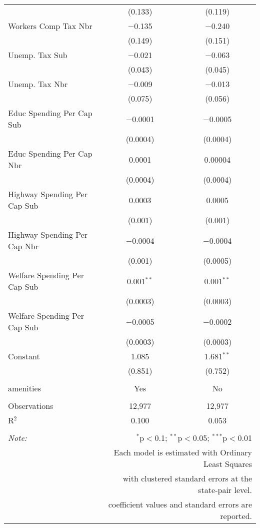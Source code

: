 \begin{table}[!htbp]
\begin{tabular}{@{\extracolsep{5pt}}lcc}
  & (0.133) & (0.119) \\ 
  Workers Comp Tax Nbr & $-$0.135 & $-$0.240 \\ 
  & (0.149) & (0.151) \\ 
  Unemp. Tax Sub & $-$0.021 & $-$0.063 \\ 
  & (0.043) & (0.045) \\ 
  Unemp. Tax Nbr & $-$0.009 & $-$0.013 \\ 
  & (0.075) & (0.056) \\ 
  Educ Spending Per Cap Sub & $-$0.0001 & $-$0.0005 \\ 
  & (0.0004) & (0.0004) \\ 
  Educ Spending Per Cap Nbr & 0.0001 & 0.00004 \\ 
  & (0.0004) & (0.0004) \\ 
  Highway Spending Per Cap Sub & 0.0003 & 0.0005 \\ 
  & (0.001) & (0.001) \\ 
  Highway Spending Per Cap Nbr & $-$0.0004 & $-$0.0004 \\ 
  & (0.001) & (0.0005) \\ 
  Welfare Spending Per Cap Sub & 0.001$^{**}$ & 0.001$^{**}$ \\ 
  & (0.0003) & (0.0003) \\ 
  Welfare Spending Per Cap Sub & $-$0.0005 & $-$0.0002 \\ 
  & (0.0003) & (0.0003) \\ 
  Constant & 1.085 & 1.681$^{**}$ \\ 
  & (0.851) & (0.752) \\ 
 \hline \\[-1.8ex] 
amenities & Yes & No \\ 
\hline \\[-1.8ex] 
Observations & 12,977 & 12,977 \\ 
R$^{2}$ & 0.100 & 0.053 \\ 
\hline 
\hline \\[-1.8ex] 
\textit{Note:}  & \multicolumn{2}{r}{$^{*}$p$<$0.1; $^{**}$p$<$0.05; $^{***}$p$<$0.01} \\ 
 & \multicolumn{2}{r}{Each model is estimated with Ordinary Least Squares} \\ 
 & \multicolumn{2}{r}{with clustered standard errors at the state-pair level.} \\ 
 & \multicolumn{2}{r}{coefficient values and standard errors are reported.} \\ 
\end{tabular} 
\end{table} 
